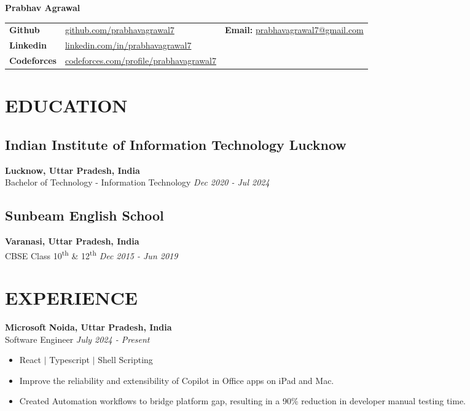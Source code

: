 \documentclass[12pt]{article}
\begin{document}
{\LARGE\textbf{Prabhav Agrawal}} \\
\vspace*{10pt}

\noindent
\begin{tabularx}{\textwidth}{@{}l X r }
			\textbf{Github} & \href{https://github.com/prabhavagrawal7}{github.com/prabhavagrawal7} & \textbf{Email:} \href{mailto:prabhavagrawal7@gmail.com}{prabhavagrawal7@gmail.com} \\
			\textbf{Linkedin} & \href{https://linkedin.com/in/prabhavagrawal7}{linkedin.com/in/prabhavagrawal7} \\
	\textbf{Codeforces} & \href{https://codeforces.com/profile/prabhavagrawal7}{codeforces.com/profile/prabhavagrawal7} & \\
\end{tabularx}
	
\section*{EDUCATION}
\subsection*{Indian Institute of Information Technology Lucknow}	\hfill\textbf{Lucknow, Uttar Pradesh, India} \\
Bachelor of Technology - Information Technology 	\hfill\textit{Dec 2020 -  Jul 2024} \\

\subsection*{Sunbeam English School}	\hfill\textbf{Varanasi, Uttar Pradesh, India} \\
CBSE Class 10\textsuperscript{th} \& 12\textsuperscript{th}  \hfill \textit{Dec 2015 - Jun 2019} \\

\section*{EXPERIENCE}
\textbf{Microsoft} \hfill \textbf{Noida, Uttar Pradesh, India} \\
Software Engineer  \hfill \textit{July 2024 - Present} \\
\begin{itemize}[topsep=1pt, itemsep=1.5pt, partopsep=1pt, parsep=1pt]
	\item React $|$ Typescript $|$ Shell Scripting
	\item Improve the reliability and extensibility of Copilot in Office apps on iPad and Mac.
	\item Created Automation workflows to bridge platform gap, resulting in a 90\% reduction in developer manual testing time.
\end{itemize}
\end{document}
